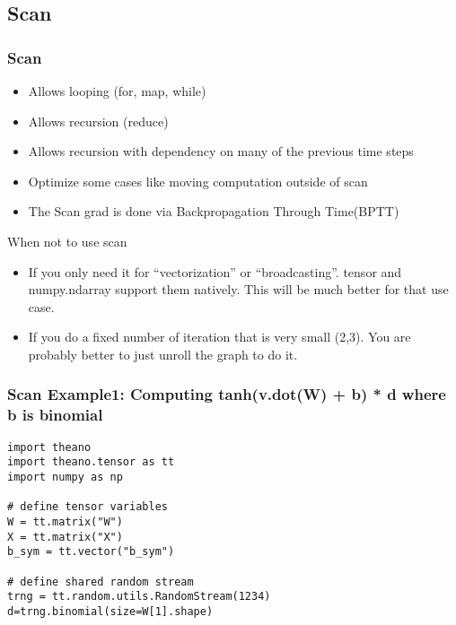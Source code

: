 \documentclass[utf8x,xcolor=pdftex,dvipsnames,table]{beamer}
\begin{document}
\subsection{Scan}
\begin{frame}
  \frametitle{Scan}
\begin{itemize}
\item Allows looping (for, map, while)
\item Allows recursion (reduce)
\item Allows recursion with dependency on many of the previous time steps
\item Optimize some cases like moving computation outside of scan
\item The Scan grad is done via Backpropagation Through Time(BPTT)
\end{itemize}
\end{frame}

\begin{frame}{When not to use scan}
\begin{itemize}
\item If you only need it for ``vectorization'' or
  ``broadcasting''. tensor and numpy.ndarray support them
  natively. This will be much better for that use case.

\item If you do a fixed number of iteration that is very small (2,3). You
  are probably better to just unroll the graph to do it.

\end{itemize}
\end{frame}


\begin{frame}
  \frametitle{Scan Example1: Computing tanh(v.dot(W) + b) * d where b is binomial}

\begin{lstlisting}
import theano
import theano.tensor as tt
import numpy as np

# define tensor variables
W = tt.matrix("W")
X = tt.matrix("X")
b_sym = tt.vector("b_sym")

# define shared random stream
trng = tt.random.utils.RandomStream(1234)
d=trng.binomial(size=W[1].shape)
\end{lstlisting}
\end{frame}
\end{document}

